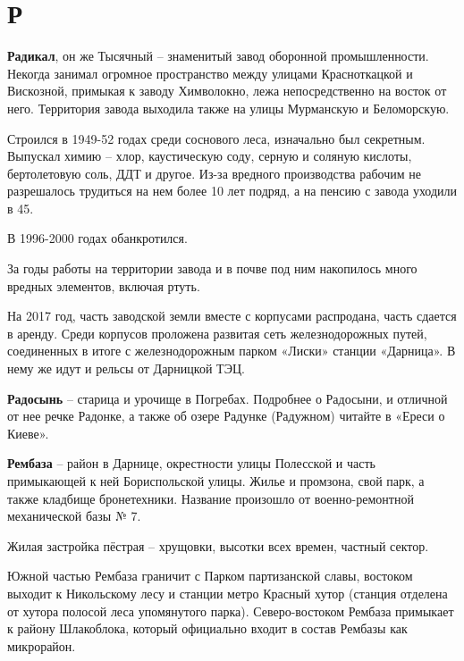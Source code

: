 \chapter*{Р}

\textbf{Радикал}, он же Тысячный – знаменитый завод оборонной промышленности. Некогда занимал огромное пространство между улицами Красноткацкой и Вискозной, примыкая к заводу Химволокно, лежа непосредственно на восток от него. Территория завода выходила также на улицы Мурманскую и Беломорскую.

Строился в 1949-52 годах среди соснового леса, изначально был секретным. Выпускал химию –  хлор, каустическую соду, серную и соляную кислоты, бертолетовую соль, ДДТ и другое. Из-за вредного производства рабочим не разрешалось трудиться на нем более 10 лет подряд, а на пенсию с завода уходили в 45.

В 1996-2000 годах обанкротился.

За годы работы на территории завода и в почве под ним накопилось много вредных элементов, включая ртуть.

На 2017 год, часть заводской земли вместе с корпусами распродана, часть сдается в аренду. Среди корпусов проложена развитая сеть железнодорожных путей, соединенных в итоге с железнодорожным парком «Лиски» станции «Дарница». В нему же идут и рельсы от Дарницкой ТЭЦ.\\

\medskip

\textbf{Радосынь} – старица и урочище в Погребах. Подробнее о Радосыни, и отличной от нее речке Радонке, а также об озере Радунке (Радужном) читайте в «Ереси о Киеве».\\

\medskip

\textbf{Рембаза} – район в Дарнице, окрестности улицы Полесской и часть примыкающей к ней Бориспольской улицы. Жилье и промзона, свой парк, а также кладбище бронетехники. Название произошло от военно-ремонтной механической базы № 7.

Жилая застройка пёстрая – хрущовки, высотки всех времен, частный сектор.

Южной частью Рембаза граничит с Парком партизанской славы, востоком выходит к Никольскому лесу и станции метро Красный хутор (станция отделена от хутора полосой леса упомянутого парка). Северо-востоком Рембаза примыкает к району Шлакоблока, который официально входит в состав Рембазы как микрорайон.\\

